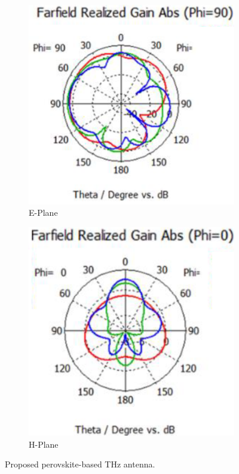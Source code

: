 \documentclass[12pt]{suhbook}
\begin{document}
\begin{figure}[hbt!]
\begin{subfigure}{.45\textwidth}
\centering
\includegraphics[width=0.9\linewidth]{20}
\caption{E-Plane}
\label{fig:sfig15a}
\end{subfigure}%
\begin{subfigure}{.45\textwidth}
  \centering
  \includegraphics[width=0.9\linewidth]{21}
  \caption{H-Plane}
  \label{fig:sfigb15}
\end{subfigure}
\caption{Proposed perovskite-based THz antenna.}
\label{fig:fig 15}
\end{figure}
\end{document}
